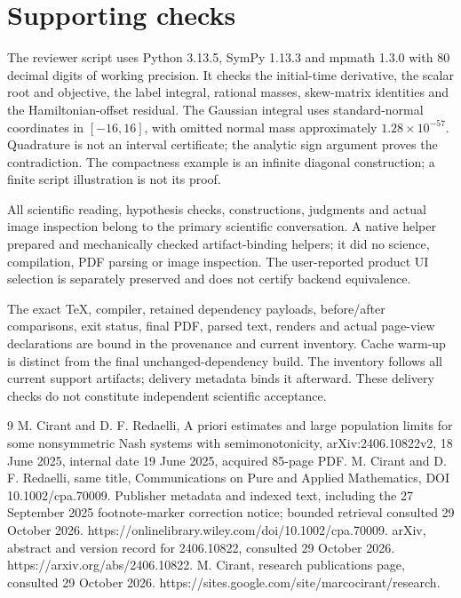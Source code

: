 \documentclass[10pt]{article}
\begin{document}
\section*{Supporting checks}
The reviewer script uses Python 3.13.5, SymPy 1.13.3 and mpmath 1.3.0 with 80 decimal digits of working precision. It checks the initial-time derivative, the scalar root and objective, the label integral, rational masses, skew-matrix identities and the Hamiltonian-offset residual. The Gaussian integral uses standard-normal coordinates in \([-16,16]\), with omitted normal mass approximately \(1.28\times10^{-57}\). Quadrature is not an interval certificate; the analytic sign argument proves the contradiction. The compactness example is an infinite diagonal construction; a finite script illustration is not its proof.\par
All scientific reading, hypothesis checks, constructions, judgments and actual image inspection belong to the primary scientific conversation. A native helper prepared and mechanically checked artifact-binding helpers; it did no science, compilation, PDF parsing or image inspection. The user-reported product UI selection is separately preserved and does not certify backend equivalence.\par
The exact TeX, compiler, retained dependency payloads, before/after comparisons, exit status, final PDF, parsed text, renders and actual page-view declarations are bound in the provenance and current inventory. Cache warm-up is distinct from the final unchanged-dependency build. The inventory follows all current support artifacts; delivery metadata binds it afterward. These delivery checks do not constitute independent scientific acceptance.\par
9 M. Cirant and D. F. Redaelli, A priori estimates and large population limits for some nonsymmetric Nash systems with semimonotonicity, arXiv:2406.10822v2, 18 June 2025, internal date 19 June 2025, acquired 85-page PDF. M. Cirant and D. F. Redaelli, same title, Communications on Pure and Applied Mathematics, DOI 10.1002/cpa.70009. Publisher metadata and indexed text, including the 27 September 2025 footnote-marker correction notice; bounded retrieval consulted 29 October 2026. https://onlinelibrary.wiley.com/doi/10.1002/cpa.70009. arXiv, abstract and version record for 2406.10822, consulted 29 October 2026. https://arxiv.org/abs/2406.10822. M. Cirant, research publications page, consulted 29 October 2026. https://sites.google.com/site/marcocirant/research.\par
\end{document}
